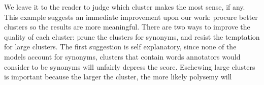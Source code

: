We leave it to the reader to judge which cluster makes the most sense, if any. This example suggests an immediate improvement upon our work: procure better clusters so the results are more meaningful. There are two ways to improve the quality of each cluster: prune the clusters for synonyms, and resist the temptation for large clusters. The first suggestion is self explanatory, since none of the models account for synonyms, clusters that contain words annotators would consider to be synonyms will unfairly depress the score. Eschewing large clusters is important because the larger the cluster, the more likely polysemy will 
























































